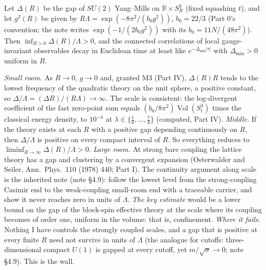 \begin{conjecture}\label{conj:V-M2}
Let $\Delta(R)$ be the gap of $SU(2)$ Yang--Mills on $\mathbb R\times S^3_R$ (fixed squashing $t$), and let $g^2(R)$
be given by $R\Lambda=\exp(-8\pi^2/(b_0g^2))$, $b_0=22/3$ (Part 0's convention; the note writes
$\exp(-1/(2b_0g^2))$ with its $b_0=11N/(48\pi^2)$). Then $\inf_{R>0}\Delta(R)/\Lambda>0$, and the
connected correlations of local gauge-invariant observables decay in Euclidean time at least like
$e^{-\Delta_{\min}|\tau|}$ with $\Delta_{\min}>0$ uniform in $R$.
\end{conjecture}
\begin{sketch}
\emph{Small room.} As $R\to0$, $g\to0$ and, granted M3 (Part IV), $\Delta(R)R$ tends to the lowest frequency of the
quadratic theory on the unit sphere, a positive constant, so
$\Delta/\Lambda=(\Delta R)/(R\Lambda)\to\infty$. The scale is consistent: the log-divergent coefficient of the fast
zero-point sum equals $(b_0/8\pi^2)\operatorname{Vol}(S^3_t)$ times the classical energy density, to $10^{-4}$ at $\lambda\in\{\frac18,\dots,\frac78\}$ (computed, Part IV). \emph{Middle.} If the theory exists at each $R$ with a positive gap
depending continuously on $R$, then $\Delta/\Lambda$ is positive on every compact interval of $R$. So everything
reduces to $\liminf_{R\to\infty}\Delta(R)/\Lambda>0$. \emph{Large room.} At strong bare coupling the lattice theory
has a gap and clustering by a convergent expansion (Osterwalder and Seiler, Ann.\ Phys.\ 110 (1978) 440; Part I). The
continuity argument along scale is the inherited note (note \S4.9): follow the lowest level from the strong-coupling
Casimir end to the weak-coupling small-room end with a traceable carrier, and show it never reaches zero in units of
$\Lambda$. \emph{The key estimate} would be a lower bound on the gap of the block-spin effective theory at the scale
where its coupling becomes of order one, uniform in the volume: that is, confinement. \emph{Where it fails.} Nothing
I have controls the strongly coupled scales, and a gap that is positive at every finite $R$ need not survive in units
of $\Lambda$ (the analogue for cutoffs: three-dimensional compact $U(1)$ is gapped at every cutoff, yet $m/\sqrt\sigma\to0$;
note \S4.9). This is the wall.
\end{sketch}

